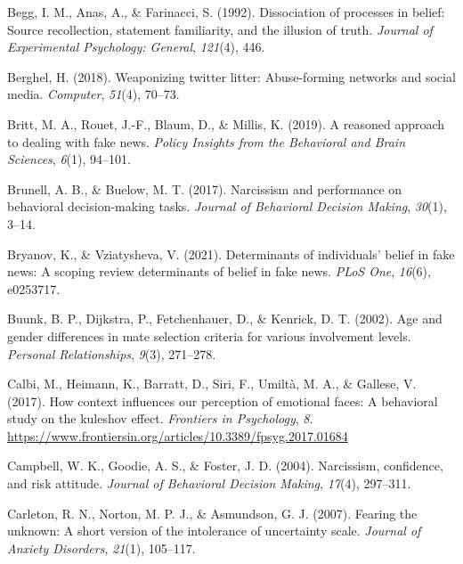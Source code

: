 \documentclass[
  man,floatsintext]{apa6}
\newlength{\cslhangindent}
\newlength{\cslentryspacingunit} %
\newenvironment{CSLReferences}[2] %
 {%
  \setlength{\parindent}{0pt}
  \ifodd #1
  \let\oldpar\par
  \def\par{\hangindent=\cslhangindent\oldpar}
  \fi
  \setlength{\parskip}{#2\cslentryspacingunit}
 }%
 {}
\begin{document}
\begin{CSLReferences}{1}{0}
\leavevmode{}%
Begg, I. M., Anas, A., \& Farinacci, S. (1992). Dissociation of processes in belief: Source recollection, statement familiarity, and the illusion of truth. \emph{Journal of Experimental Psychology: General}, \emph{121}(4), 446.

\leavevmode{}%
Berghel, H. (2018). Weaponizing twitter litter: Abuse-forming networks and social media. \emph{Computer}, \emph{51}(4), 70--73.

\leavevmode{}%
Britt, M. A., Rouet, J.-F., Blaum, D., \& Millis, K. (2019). A reasoned approach to dealing with fake news. \emph{Policy Insights from the Behavioral and Brain Sciences}, \emph{6}(1), 94--101.

\leavevmode{}%
Brunell, A. B., \& Buelow, M. T. (2017). Narcissism and performance on behavioral decision-making tasks. \emph{Journal of Behavioral Decision Making}, \emph{30}(1), 3--14.

\leavevmode{}%
Bryanov, K., \& Vziatysheva, V. (2021). Determinants of individuals' belief in fake news: A scoping review determinants of belief in fake news. \emph{PLoS One}, \emph{16}(6), e0253717.

\leavevmode{}%
Buunk, B. P., Dijkstra, P., Fetchenhauer, D., \& Kenrick, D. T. (2002). Age and gender differences in mate selection criteria for various involvement levels. \emph{Personal Relationships}, \emph{9}(3), 271--278.

\leavevmode{}%
Calbi, M., Heimann, K., Barratt, D., Siri, F., Umiltà, M. A., \& Gallese, V. (2017). How context influences our perception of emotional faces: A behavioral study on the kuleshov effect. \emph{Frontiers in Psychology}, \emph{8}. \url{https://www.frontiersin.org/articles/10.3389/fpsyg.2017.01684}

\leavevmode{}%
Campbell, W. K., Goodie, A. S., \& Foster, J. D. (2004). Narcissism, confidence, and risk attitude. \emph{Journal of Behavioral Decision Making}, \emph{17}(4), 297--311.

\leavevmode{}%
Carleton, R. N., Norton, M. P. J., \& Asmundson, G. J. (2007). Fearing the unknown: A short version of the intolerance of uncertainty scale. \emph{Journal of Anxiety Disorders}, \emph{21}(1), 105--117.


\end{CSLReferences}
\end{document}
